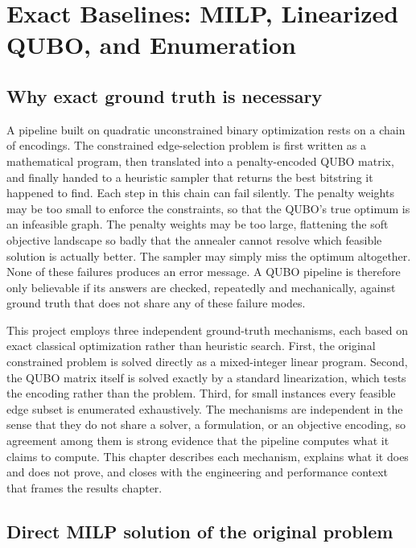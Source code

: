 \section{Exact Baselines: MILP, Linearized QUBO, and Enumeration}

\subsection{Why exact ground truth is necessary}

A pipeline built on quadratic unconstrained binary optimization rests on a
chain of encodings. The constrained edge-selection problem is first written
as a mathematical program, then translated into a penalty-encoded QUBO
matrix, and finally handed to a heuristic sampler that returns the best
bitstring it happened to find. Each step in this chain can fail silently.
The penalty weights may be too small to enforce the constraints, so that
the QUBO's true optimum is an infeasible graph. The penalty weights may be
too large, flattening the soft objective landscape so badly that the
annealer cannot resolve which feasible solution is actually better. The
sampler may simply miss the optimum altogether. None of these failures
produces an error message. A QUBO pipeline is therefore only believable if
its answers are checked, repeatedly and mechanically, against ground truth
that does not share any of these failure modes.

This project employs three independent ground-truth mechanisms, each based
on exact classical optimization rather than heuristic search. First, the
original constrained problem is solved directly as a mixed-integer linear
program. Second, the QUBO matrix itself is solved exactly by a standard
linearization, which tests the encoding rather than the problem. Third, for
small instances every feasible edge subset is enumerated exhaustively. The
mechanisms are independent in the sense that they do not share a solver, a
formulation, or an objective encoding, so agreement among them is strong
evidence that the pipeline computes what it claims to compute. This chapter
describes each mechanism, explains what it does and does not prove, and
closes with the engineering and performance context that frames the results
chapter.

\subsection{Direct MILP solution of the original problem}

